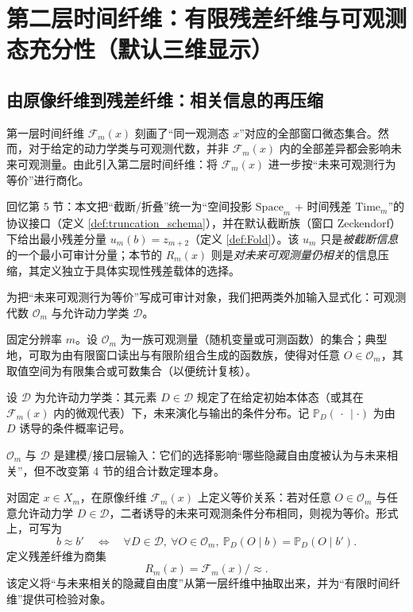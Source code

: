 \section{第二层时间纤维：有限残差纤维与可观测态充分性（默认三维显示）}

\subsection{由原像纤维到残差纤维：相关信息的再压缩}

第一层时间纤维 $\mathcal F_m(x)$ 刻画了“同一观测态 $x$”对应的全部窗口微态集合。然而，对于给定的动力学类与可观测代数，并非 $\mathcal F_m(x)$ 内的全部差异都会影响未来可观测量。由此引入第二层时间纤维：将 $\mathcal F_m(x)$ 进一步按“未来可观测行为等价”进行商化。\par

\AuditTag 回忆第 5 节：本文把“截断/折叠”统一为“空间投影 $\mathrm{Space}_m$ + 时间残差 $\mathrm{Time}_m$”的协议接口（定义 \ref{def:truncation_schema}），并在默认截断族（窗口 Zeckendorf）下给出最小残差分量 $u_m(b)=z_{m+2}$（定义 \ref{def:Fold}）。该 $u_m$ 只是\emph{被截断信息}的一个最小可审计分量；本节的 $R_m(x)$ 则是\emph{对未来可观测量仍相关}的信息压缩，其定义独立于具体实现性残差载体的选择。

\InterfaceTag 为把“未来可观测行为等价”写成可审计对象，我们把两类外加输入显式化：可观测代数 $\mathcal O_m$ 与允许动力学类 $\mathcal D$。

\begin{definition}[可观测代数与允许动力学类]\label{def:observable_algebra_and_dynamics_class}
\InterfaceTag 固定分辨率 $m$。设 $\mathcal O_m$ 为一族可观测量（随机变量或可测函数）的集合；典型地，可取为由有限窗口读出与有限阶组合生成的函数族，使得对任意 $O\in\mathcal O_m$，其取值空间为有限集合或可数集合（以便统计复核）。

\InterfaceTag 设 $\mathcal D$ 为允许动力学类：其元素 $D\in\mathcal D$ 规定了在给定初始本体态（或其在 $\mathcal F_m(x)$ 内的微观代表）下，未来演化与输出的条件分布。记 $\mathbb P_D(\,\cdot\,\mid\cdot)$ 为由 $D$ 诱导的条件概率记号。

\AuditTag $\mathcal O_m$ 与 $\mathcal D$ 是建模/接口层输入：它们的选择影响“哪些隐藏自由度被认为与未来相关”，但不改变第 4 节的组合计数定理本身。
\end{definition}

对固定 $x\in X_m$，在原像纤维 $\mathcal F_m(x)$ 上定义等价关系：若对任意 $O\in \mathcal O_m$ 与任意允许动力学 $D\in\mathcal D$，二者诱导的未来可观测条件分布相同，则视为等价。形式上，可写为
$$
b\approx b'
\quad\Longleftrightarrow\quad
\forall D\in\mathcal D,\ \forall O\in\mathcal O_m,\
\mathbb{P}_D\left(O\mid b\right)=\mathbb{P}_D\left(O\mid b'\right).
$$
定义残差纤维为商集
$$
R_m(x)=\mathcal F_m(x)/{\approx}.
$$
该定义将“与未来相关的隐藏自由度”从第一层纤维中抽取出来，并为“有限时间纤维”提供可检验对象。

